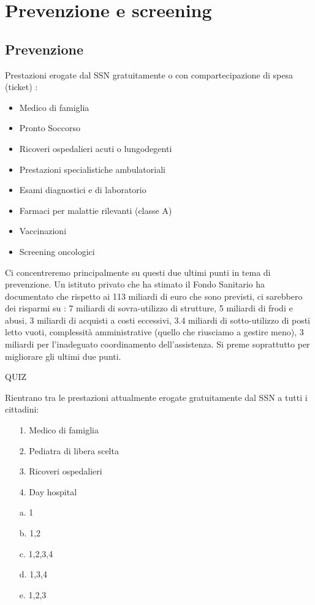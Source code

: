 \section{Prevenzione e screening}

\subsection{Prevenzione}

Prestazioni erogate dal SSN gratuitamente o con compartecipazione di
spesa (ticket) :

\begin{itemize}
\item
  Medico di famiglia
\item
  Pronto Soccorso
\item
  Ricoveri ospedalieri acuti o lungodegenti
\item
  Prestazioni specialistiche ambulatoriali
\item
  Esami diagnostici e di laboratorio
\item
  Farmaci per malattie rilevanti (classe A)
\item
  Vaccinazioni
\item
  Screening oncologici
\end{itemize}

Ci concentreremo principalmente su questi due ultimi punti in tema di
prevenzione. Un istituto privato che ha stimato il Fondo Sanitario ha
documentato che rispetto ai 113 miliardi di euro che sono previsti, ci
sarebbero dei risparmi su : 7 miliardi di sovra-utilizzo di strutture, 5
miliardi di frodi e abusi, 3 miliardi di acquisti a costi eccessivi, 3.4
miliardi di sotto-utilizzo di posti letto vuoti, complessità
amministrative (quello che riusciamo a gestire meno), 3 miliardi per
l'inadeguato coordinamento dell'assistenza. Si preme soprattutto per
migliorare gli ultimi due punti.

QUIZ

Rientrano tra le prestazioni attualmente erogate gratuitamente dal SSN a
tutti i cittadini:

\begin{itemize}
\item[1.]
  Medico di famiglia
\item[2.]
  Pediatra di libera scelta
\item[3.]
  Ricoveri ospedalieri
\item[4.]
  Day hospital
\end{itemize}

\begin{itemize}
\item[a.]
  1
\item[b.]
  1,2
\item[c.]
  1,2,3,4
\item[d.]
  1,3,4
\item[e.]
  1,2,3
\end{itemize}

